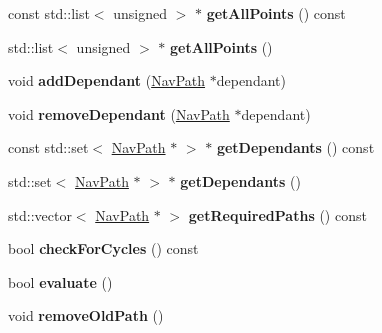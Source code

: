 \begin{DoxyCompactItemize}
\item 
const std\+::list$<$ unsigned $>$ $\ast$ {\bfseries get\+All\+Points} () const \hypertarget{classNavPath_af7cfca1b42395037a214ac5911b38b84}{}\label{classNavPath_af7cfca1b42395037a214ac5911b38b84}

\item 
std\+::list$<$ unsigned $>$ $\ast$ {\bfseries get\+All\+Points} ()\hypertarget{classNavPath_ac9b642aa9a702fe19b9a0c8ad7b32cda}{}\label{classNavPath_ac9b642aa9a702fe19b9a0c8ad7b32cda}

\item 
void {\bfseries add\+Dependant} (\hyperlink{classNavPath}{Nav\+Path} $\ast$dependant)\hypertarget{classNavPath_a11cfaf443a8cd934dbfc7c7fb74c095c}{}\label{classNavPath_a11cfaf443a8cd934dbfc7c7fb74c095c}

\item 
void {\bfseries remove\+Dependant} (\hyperlink{classNavPath}{Nav\+Path} $\ast$dependant)\hypertarget{classNavPath_a4b9be54eb74610348bde00054419227e}{}\label{classNavPath_a4b9be54eb74610348bde00054419227e}

\item 
const std\+::set$<$ \hyperlink{classNavPath}{Nav\+Path} $\ast$ $>$ $\ast$ {\bfseries get\+Dependants} () const \hypertarget{classNavPath_a3e84af9f03533a4d27aac21d0a46b3e9}{}\label{classNavPath_a3e84af9f03533a4d27aac21d0a46b3e9}

\item 
std\+::set$<$ \hyperlink{classNavPath}{Nav\+Path} $\ast$ $>$ $\ast$ {\bfseries get\+Dependants} ()\hypertarget{classNavPath_a51a93a4b1f8b86077aca55fd9317b52d}{}\label{classNavPath_a51a93a4b1f8b86077aca55fd9317b52d}

\item 
std\+::vector$<$ \hyperlink{classNavPath}{Nav\+Path} $\ast$ $>$ {\bfseries get\+Required\+Paths} () const \hypertarget{classNavPath_ab417e3cdfe7e193e757806b6e0046905}{}\label{classNavPath_ab417e3cdfe7e193e757806b6e0046905}

\item 
bool {\bfseries check\+For\+Cycles} () const \hypertarget{classNavPath_a123a2047d77aaf154035ca4a171f1a46}{}\label{classNavPath_a123a2047d77aaf154035ca4a171f1a46}

\item 
bool {\bfseries evaluate} ()\hypertarget{classNavPath_a02d9dd4ae2879b88fe806c791d7c47f7}{}\label{classNavPath_a02d9dd4ae2879b88fe806c791d7c47f7}

\item 
void {\bfseries remove\+Old\+Path} ()\hypertarget{classNavPath_ae8b283e8ee739d43d6a51b5b61351db4}{}\label{classNavPath_ae8b283e8ee739d43d6a51b5b61351db4}


\end{DoxyCompactItemize}
